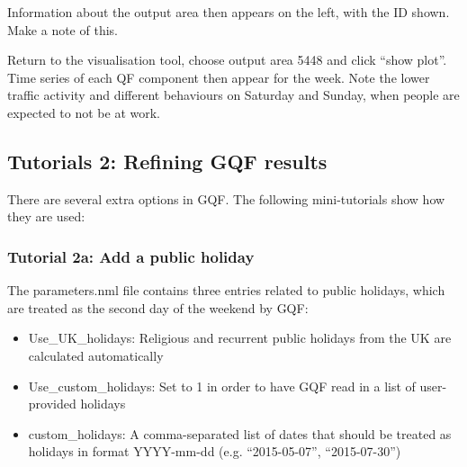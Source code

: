 \documentclass[letterpaper,10pt,english]{sphinxmanual}
\begin{document}
Information about the output area
then appears on the left, with the ID shown. Make a note of this.
\begin{quote}

\begin{figure}[htbp]
\centering
\capstart

\noindent{}
\caption{}\label{\detokenize{Tutorials/GQF:id8}}\end{figure}
\end{quote}

Return to the visualisation tool, choose output area 5448 and click
“show plot”. Time series of each QF component then appear for the week.
Note the lower traffic activity and different behaviours on Saturday and
Sunday, when people are expected to not be at work.
\begin{quote}

\begin{figure}[htbp]
\centering

\noindent{}
\end{figure}
\end{quote}


\subsection{Tutorials 2: Refining GQF results}
\label{\detokenize{Tutorials/GQF:tutorials-2-refining-gqf-results}}
There are several extra options in GQF. The following mini-tutorials
show how they are used:


\subsubsection{Tutorial 2a: Add a public holiday}
\label{\detokenize{Tutorials/GQF:tutorial-2a-add-a-public-holiday}}
The parameters.nml file contains three entries related to public
holidays, which are treated as the second day of the weekend by GQF:
\begin{itemize}
\item {} 
Use\_UK\_holidays: Religious and recurrent public holidays from the
UK are calculated automatically

\item {} 
Use\_custom\_holidays: Set to 1 in order to have GQF read in a list
of user-provided holidays

\item {} 
custom\_holidays: A comma-separated list of dates that should be
treated as holidays in format YYYY-mm-dd (e.g. “2015-05-07”,
“2015-07-30”)

\end{itemize}
\end{document}
